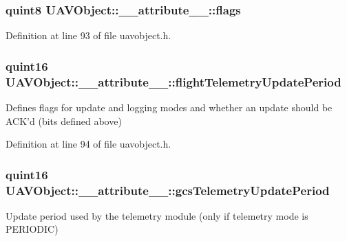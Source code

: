 \hypertarget{group___u_a_v_objects_plugin_gaf5421bbd1e8748b9f0f12ba5b6722bdd}{
\subsubsection[{flags}]{\setlength{\rightskip}{0pt plus 5cm}quint8 {\bf \-U\-A\-V\-Object\-::\-\_\-\-\_\-attribute\-\_\-\-\_\-\-::flags}}}\label{group___u_a_v_objects_plugin_gaf5421bbd1e8748b9f0f12ba5b6722bdd}


\-Definition at line 93 of file uavobject.\-h.

\hypertarget{group___u_a_v_objects_plugin_gaa29a38fd35ce73e9e4afd2698de44797}{
\subsubsection[{flight\-Telemetry\-Update\-Period}]{\setlength{\rightskip}{0pt plus 5cm}quint16 {\bf \-U\-A\-V\-Object\-::\-\_\-\-\_\-attribute\-\_\-\-\_\-\-::flight\-Telemetry\-Update\-Period}}}\label{group___u_a_v_objects_plugin_gaa29a38fd35ce73e9e4afd2698de44797}
\-Defines flags for update and logging modes and whether an update should be \-A\-C\-K'd (bits defined above) 

\-Definition at line 94 of file uavobject.\-h.

\hypertarget{group___u_a_v_objects_plugin_ga3698244bb0c29537b3d26442624ee03b}{
\subsubsection[{gcs\-Telemetry\-Update\-Period}]{\setlength{\rightskip}{0pt plus 5cm}quint16 {\bf \-U\-A\-V\-Object\-::\-\_\-\-\_\-attribute\-\_\-\-\_\-\-::gcs\-Telemetry\-Update\-Period}}}\label{group___u_a_v_objects_plugin_ga3698244bb0c29537b3d26442624ee03b}
\-Update period used by the telemetry module (only if telemetry mode is \-P\-E\-R\-I\-O\-D\-I\-C) 

